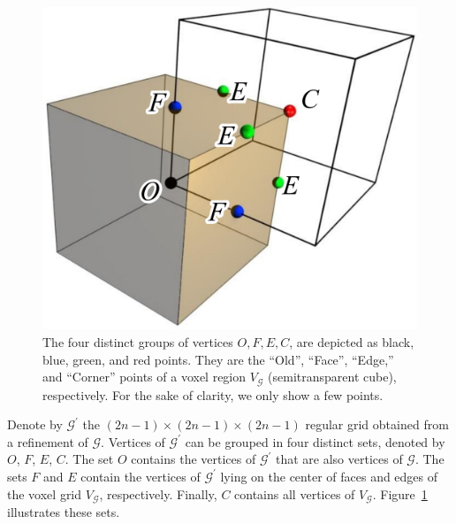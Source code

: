 \begin{figure}[t]
\centering
\includegraphics[width=0.35\linewidth]{chapter3/figures/voxel.pdf}
\caption{The four distinct groups of vertices $O, F, E, C$, are
  depicted as black, blue, green, and red points. They are the ``Old'',
  ``Face'', ``Edge,'' and ``Corner'' points of a voxel region
  $V_\mathcal{G}$ (semitransparent cube), respectively. For the sake of
  clarity, we only show a few points.}  
\label{fig:voxelgrid}
\end{figure}


Denote by $\mathcal{G}^\prime$ the $(2n-1)\times (2n-1) \times (2n-1)$ regular grid
obtained from a refinement of $\mathcal{G}$.
Vertices of $\mathcal{G}^\prime$ can be grouped in four distinct sets,
denoted by $O$, $F$, $E$, $C$. The set $O$ contains the vertices of
$\mathcal{G}^\prime$ that are also vertices of $\mathcal{G}$. The sets
$F$ and $E$ contain the vertices of $\mathcal{G}^\prime$ lying on the
center of faces and edges of the voxel grid $V_{\mathcal{G}}$,
respectively. Finally, $C$ contains all vertices of $V_{\mathcal{G}}$.
Figure~\ref{fig:voxelgrid} illustrates these sets.

